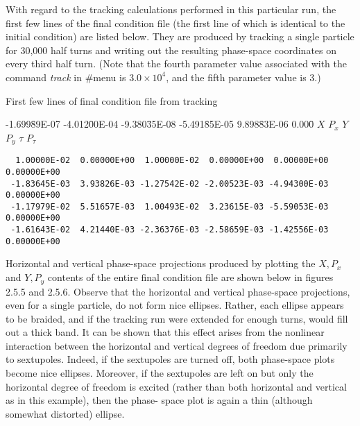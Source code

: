      With regard to the tracking calculations performed in this particular
\Mary run, the first few lines of the final condition file (the first
line of which is identical to the initial condition) are listed below.
They are produced by tracking a single particle for 30,000 half turns and
writing out the resulting phase-space coordinates on every third half turn.
(Note that the fourth parameter value associated with the command {\em track } in
\#menu is \mbox{$3.0 \times 10^4$,} and the fifth parameter value is 3.)
\vspace{5mm}

           First few lines of final condition file from tracking
\begin{footnotesize}
\begin{tt}
\begin{tabbing}
-1.699\=89E-07 -4.012\=00E-04 -9.380\=35E-08 -5.491\=85E-05 9.898\=83E-06 0.000\= \kill
\>$X$ \>$P_x$ \>$Y$ \>$P_y$ \>$\tau$ \>$P_{\tau}$
\end{tabbing}
\end{tt}
\vspace{-5mm}
\begin{verbatim}
  1.00000E-02  0.00000E+00  1.00000E-02  0.00000E+00  0.00000E+00  0.00000E+00
 -1.83645E-03  3.93826E-03 -1.27542E-02 -2.00523E-03 -4.94300E-03  0.00000E+00
 -1.17979E-02  5.51657E-03  1.00493E-02  3.23615E-03 -5.59053E-03  0.00000E+00
 -1.61643E-02  4.21440E-03 -2.36376E-03 -2.58659E-03 -1.42556E-03  0.00000E+00
\end{verbatim}
\end{footnotesize}

     Horizontal and vertical phase-space projections produced by plotting
the $X,P_x$  and $Y,P_y$  contents of the entire final condition file are shown
below in figures 2.5.5 and 2.5.6.  Observe that the horizontal and vertical
phase-space projections, even for a single particle, do not form nice
ellipses.  Rather, each ellipse appears to be braided, and if the tracking
run were extended for enough turns, would fill out a thick band.  It can be
shown that this effect arises from the nonlinear interaction between the
horizontal and vertical degrees of freedom due primarily to sextupoles.
Indeed, if the sextupoles are turned off, both phase-space plots become
nice ellipses.  Moreover, if the sextupoles are left on but only the
horizontal degree of freedom is excited (rather than both horizontal and
vertical as in this example), then the phase- space plot is again a thin
(although somewhat distorted) ellipse.

